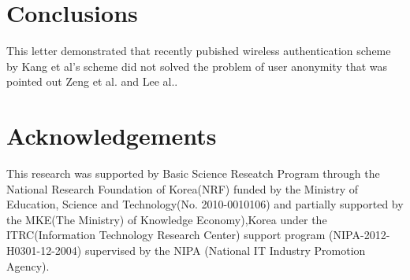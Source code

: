 \documentclass[UTF8]{ctexart}
\begin{document}
\section{Conclusions}
This letter demonstrated that recently pubished wireless authentication scheme by Kang et al's scheme did not solved the problem of user anonymity that was pointed out Zeng et al.\cite{WangWRL10} and Lee al.\cite{Barsoum11}.
\section*{Acknowledgements}
This research was supported by Basic Science Reseatch Program through the National Research Foundation of Korea(NRF) funded by the Ministry of Education, Science and Technology(No. 2010-0010106) and partially supported by the MKE(The Ministry) of Knowledge Economy),Korea under the ITRC(Information Technology Research Center) support program (NIPA-2012-H0301-12-2004) supervised by the NIPA (National IT Industry Promotion Agency).
\end{document}
